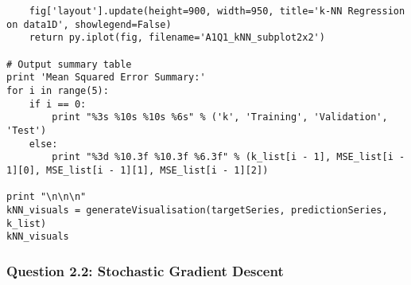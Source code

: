 \documentclass[a4paper,12pt]{article}
\begin{document}
\begin{verbatim}
    fig['layout'].update(height=900, width=950, title='k-NN Regression on data1D', showlegend=False)
    return py.iplot(fig, filename='A1Q1_kNN_subplot2x2')
    
# Output summary table
print 'Mean Squared Error Summary:'
for i in range(5):
    if i == 0:
        print "%3s %10s %10s %6s" % ('k', 'Training', 'Validation', 'Test')
    else:
        print "%3d %10.3f %10.3f %6.3f" % (k_list[i - 1], MSE_list[i - 1][0], MSE_list[i - 1][1], MSE_list[i - 1][2])

print "\n\n\n"
kNN_visuals = generateVisualisation(targetSeries, predictionSeries, k_list)
kNN_visuals
\end{verbatim}

\subsubsection{Question 2.2: Stochastic Gradient Descent}
\end{document}

